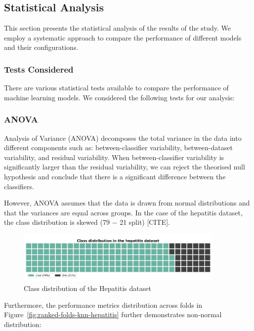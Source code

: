 \subsection{Statistical Analysis}
\label{sec:statistical-analysis}

This section presents the statistical analysis of the results of the study.
We employ a systematic approach to compare the performance of different models and their configurations.

\subsubsection*{Tests Considered}
There are various statistical tests available to compare the performance of machine learning models.
We considered the following tests for our analysis:

\subsubsection{ANOVA}
Analysis of Variance (ANOVA) decomposes the total variance in the data into different components such as:
between-classifier variability, between-dataset variability, and residual variability. When between-classifier
variability is significantly larger than the residual variability, we can reject the theorised null hypothesis and
conclude that there is a significant difference between the classifiers.

However, ANOVA assumes that the data is drawn from normal distributions and that the variances are equal across groups.
In the case of the hepatitis dataset, the class distribution is skewed (79 $-$ 21 split) [CITE].

\begin{figure}[!ht]
    \centering
    \includegraphics[width=0.9\textwidth]{figures/hepatitis-class-distribution.png}
    \caption{Class distribution of the Hepatitis dataset}
\label{fig:class-distribution-hepatitis}
\end{figure}

Furthermore, the performance metrics distribution across folds in Figure~\ref{fig:ranked-folds-knn-hepatitis} further demonstrates non-normal distribution:

